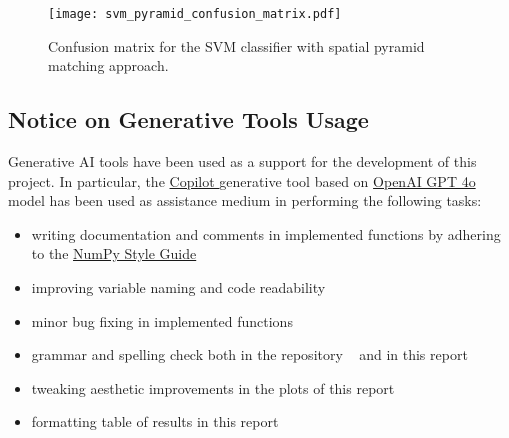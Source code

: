 \documentclass[../main.tex]{subfiles}
\begin{document}
\FloatBarrier

\begin{figure}[htb]
  \centering
  \texttt{[image: svm\_pyramid\_confusion\_matrix.pdf]}
  \caption{Confusion matrix for the SVM classifier with spatial pyramid matching
  approach.}\label{fig:confusion-matrix-pmk}
\end{figure}


\subsection{Notice on Generative Tools Usage}\label{app:generative-tools}

Generative AI tools have been used as a support for the development of this
project. In particular, the
\href{https://en.wikipedia.org/wiki/Microsoft_Copilot}{Copilot \faLink} generative tool
based on \href{https://en.wikipedia.org/wiki/GPT-4}{OpenAI GPT 4o \faLink} model has
been used as assistance medium in performing the following tasks:

\begin{itemize}
	 \item writing documentation and comments in implemented functions by
		 adhering to the
		 \href{https://numpydoc.readthedocs.io/en/latest/format.html}{NumPy
		 Style Guide \faLink}

	\item improving variable naming and code readability 
	
	\item minor bug fixing in implemented functions

	\item grammar and spelling check both in the repository
		~\cite{github} and in this report

	\item tweaking aesthetic improvements in the plots of this report

	\item formatting table of results in this report
\end{itemize}
\end{document}
